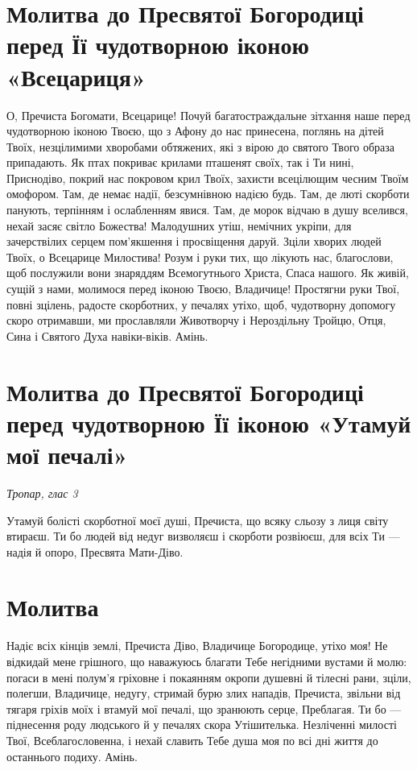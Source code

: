 \documentclass[chapters.tex]{subfiles}
\begin{document}
\section{Молитва до Пресвятої Богородиці перед Її чудотворною іконою «Всецариця»}
О, Пречиста Богомати, Всецарице! Почуй багатостраждальне зітхання наше перед чудотворною іконою Твоєю, що з Афону до нас принесена, поглянь на дітей Твоїх, незцілимими хворобами обтяжених, які з вірою до святого Твого образа припадають. Як птах покриває крилами пташенят своїх, так і Ти нині, Приснодіво, покрий нас покровом крил Твоїх, захисти всецілющим чесним Твоїм омофором. Там, де немає надії, безсумнівною надією будь. Там, де люті скорботи панують, терпінням і ослабленням явися. Там, де морок відчаю в душу вселився, нехай засяє світло Божества! Малодушних утіш, немічних укріпи, для зачерствілих серцем пом’якшення і просвіщення даруй. Зціли хворих людей Твоїх, о Всецарице Милостива! Розум і руки тих, що лікують нас, благослови, щоб послужили вони знаряддям Всемогутнього Христа, Спаса нашого. Як живій, сущій з нами, молимося перед іконою Твоєю, Владичице! Простягни руки Твої, повні зцілень, радосте скорботних, у печалях утіхо, щоб, чудотворну допомогу скоро отримавши, ми прославляли Животворчу і Нероздільну Тройцю, Отця, Сина і Святого Духа навіки-віків. Амінь.

\section{Молитва до Пресвятої Богородиці перед чудотворною Її іконою «Утамуй мої печалі»}
\emph{Тропар, глас 3}

Утамуй болісті скорботної моєї душі, Пречиста, що всяку сльозу з лиця світу втираєш. Ти бо людей від недуг визволяєш і скорботи розвіюєш, для всіх Ти — надія й опоро, Пресвята Мати-Діво.

\section{Молитва}

Надіє всіх кінців землі, Пречиста Діво, Владичице Богородице, утіхо моя! Не відкидай мене грішного, що наважуюсь благати Тебе негідними вустами й молю: погаси в мені полум’я гріховне і покаянням окропи душевні й тілесні рани, зціли, полегши, Владичице, недугу, стримай бурю злих нападів, Пречиста, звільни від тягаря гріхів моїх і втамуй мої печалі, що зранюють серце, Преблагая. Ти бо — піднесення роду людського й у печалях скора Утішителька. Незліченні милості Твої, Всеблагословенна, і нехай славить Тебе душа моя по всі дні життя до останнього подиху. Амінь.
\end{document}
